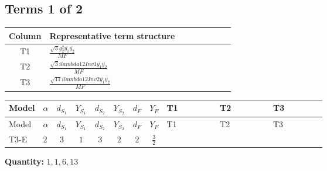 \documentclass[8pt]{article}
\begin{document}
\begin{landscape}
\subsection*{Terms 1 of 2}
\begin{center}
\begin{tabular}{@{}c >{\raggedright\arraybackslash}p{0.82\linewidth}@{}}
\toprule
Column & Representative term structure \\
\midrule
T1 & \(\displaystyle \frac{\sqrt{3} g_{2}^{2} \overline{y_{1}} \overline{y_{2}}}{MF}\) \\
\midrule
T2 & \(\displaystyle \frac{\sqrt{3} i lambda12Inv1 \overline{y_{1}} \overline{y_{2}}}{MF}\) \\
\midrule
T3 & \(\displaystyle \frac{\sqrt{11} i lambda12Inv2 \overline{y_{1}} \overline{y_{2}}}{MF}\) \\
\midrule
\bottomrule
\end{tabular}
\end{center}
\smallskip
\tiny
\begin{longtable}{@{}llcccccc >{\raggedright\arraybackslash}p{0.21\linewidth} >{\raggedright\arraybackslash}p{0.21\linewidth} >{\raggedright\arraybackslash}p{0.21\linewidth}@{}}
\toprule
Model & $\alpha$ & $d_{S_1}$ & $Y_{S_1}$ & $d_{S_2}$ & $Y_{S_2}$ & $d_F$ & $Y_F$ & T1 & T2 & T3 \\
\midrule
\endfirsthead
\toprule
Model & $\alpha$ & $d_{S_1}$ & $Y_{S_1}$ & $d_{S_2}$ & $Y_{S_2}$ & $d_F$ & $Y_F$ & T1 & T2 & T3 \\
\midrule
\endhead
T3-E & $2$ & $3$ & $1$ & $3$ & $2$ & $2$ & $\frac{3}{2}$ & \scriptsize\adjustbox{max width=\linewidth}{$\begin{gathered} - \frac{\sqrt{3} g_{2}^{2} \overline{y_{1}} \overline{y_{2}}}{6 MF}\end{gathered}$} & \scriptsize\adjustbox{max width=\linewidth}{$\begin{gathered} - \frac{\sqrt{3} i lambda12Inv1 \overline{y_{1}} \overline{y_{2}}}{6 MF}\end{gathered}$} & \scriptsize\adjustbox{max width=\linewidth}{$\begin{gathered} \frac{3 \sqrt{11} i lambda12Inv2 \overline{y_{1}} \overline{y_{2}}}{22 MF}\end{gathered}$} \\
\midrule
\bottomrule
\end{longtable}
\clearpage
\noindent\textbf{Quantity: }$\mathrm{1,1,6,13}$\par\smallskip

\end{landscape}
\end{document}
